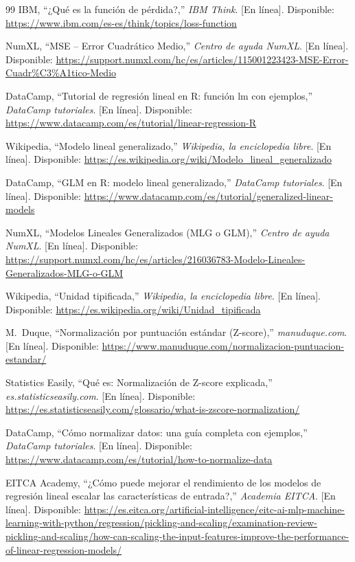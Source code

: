 \documentclass[11pt,a4paper]{article}
\begin{document}
\begin{thebibliography}{99}
 IBM, ``¿Qué es la función de pérdida?,'' \textit{IBM Think}. [En línea]. Disponible: \url{https://www.ibm.com/es-es/think/topics/loss-function}

 NumXL, ``MSE -- Error Cuadrático Medio,'' \textit{Centro de ayuda NumXL}. [En línea]. Disponible: \url{https://support.numxl.com/hc/es/articles/115001223423-MSE-Error-Cuadr\%C3\%A1tico-Medio}

 DataCamp, ``Tutorial de regresión lineal en R: función lm con ejemplos,'' \textit{DataCamp tutoriales}. [En línea]. Disponible: \url{https://www.datacamp.com/es/tutorial/linear-regression-R}

 Wikipedia, ``Modelo lineal generalizado,'' \textit{Wikipedia, la enciclopedia libre}. [En línea]. Disponible: \url{https://es.wikipedia.org/wiki/Modelo_lineal_generalizado}

 DataCamp, ``GLM en R: modelo lineal generalizado,'' \textit{DataCamp tutoriales}. [En línea]. Disponible: \url{https://www.datacamp.com/es/tutorial/generalized-linear-models}

 NumXL, ``Modelos Lineales Generalizados (MLG o GLM),'' \textit{Centro de ayuda NumXL}. [En línea]. Disponible: \url{https://support.numxl.com/hc/es/articles/216036783-Modelo-Lineales-Generalizados-MLG-o-GLM}

 Wikipedia, ``Unidad tipificada,'' \textit{Wikipedia, la enciclopedia libre}. [En línea]. Disponible: \url{https://es.wikipedia.org/wiki/Unidad_tipificada}

 M.\ Duque, ``Normalización por puntuación estándar (Z-score),'' \textit{manuduque.com}. [En línea]. Disponible: \url{https://www.manuduque.com/normalizacion-puntuacion-estandar/}

 Statistics Easily, ``Qué es: Normalización de Z-score explicada,'' \textit{es.statisticseasily.com}. [En línea]. Disponible: \url{https://es.statisticseasily.com/glossario/what-is-zscore-normalization/}

 DataCamp, ``Cómo normalizar datos: una guía completa con ejemplos,'' \textit{DataCamp tutoriales}. [En línea]. Disponible: \url{https://www.datacamp.com/es/tutorial/how-to-normalize-data}

 EITCA Academy, ``¿Cómo puede mejorar el rendimiento de los modelos de regresión lineal escalar las características de entrada?,'' \textit{Academia EITCA}. [En línea]. Disponible: \url{https://es.eitca.org/artificial-intelligence/eitc-ai-mlp-machine-learning-with-python/regression/pickling-and-scaling/examination-review-pickling-and-scaling/how-can-scaling-the-input-features-improve-the-performance-of-linear-regression-models/}


\end{thebibliography}
\end{document}
